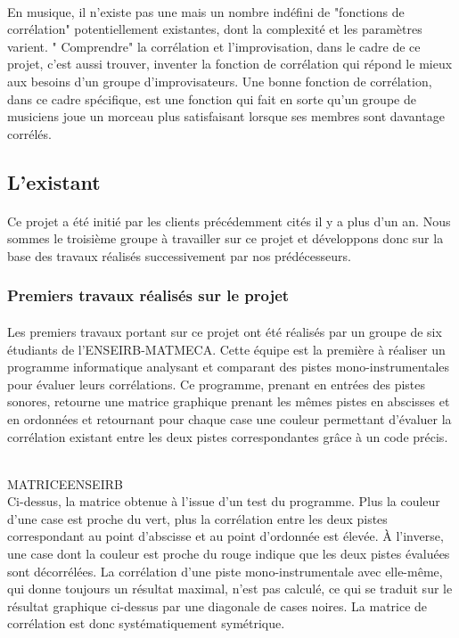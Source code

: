 \paragraph{}
En musique, il n'existe pas une mais un nombre indéfini de "fonctions
de corrélation" potentiellement existantes, dont la complexité et les
paramètres varient. " Comprendre" la corrélation et l'improvisation,
dans le cadre de ce projet, c'est aussi trouver, inventer la fonction
de corrélation qui répond le mieux aux besoins d'un groupe
d'improvisateurs. Une bonne fonction de corrélation, dans ce cadre
spécifique, est une fonction qui fait en sorte qu'un groupe de
musiciens joue un morceau plus satisfaisant lorsque ses membres sont
davantage corrélés.

\subsection{L'existant}
\paragraph{}
Ce projet a été initié par les clients précédemment cités il y a plus
d'un an. Nous sommes le troisième groupe à travailler sur ce projet et
développons donc sur la base des travaux réalisés successivement par
nos prédécesseurs.

\subsubsection{Premiers travaux réalisés sur le projet}
\paragraph{}
Les premiers travaux portant sur ce projet ont été réalisés par un
groupe de six étudiants de l'ENSEIRB-MATMECA. Cette équipe est la
première à réaliser un programme informatique analysant et comparant
des pistes mono-instrumentales pour évaluer leurs corrélations. Ce
programme, prenant en entrées des pistes sonores, retourne une matrice
graphique prenant les mêmes pistes en abscisses et en ordonnées et
retournant pour chaque case une couleur permettant d'évaluer la
corrélation existant entre les deux pistes correspondantes grâce à un
code précis.

\\
MATRICEENSEIRB
\\
Ci-dessus, la matrice obtenue à l'issue d'un test du programme. Plus
la couleur d'une case est proche du vert, plus la corrélation entre
les deux pistes correspondant au point d'abscisse et au point
d'ordonnée est élevée. À l'inverse, une case dont la couleur est
proche du rouge indique que les deux pistes évaluées sont
décorrélées. La corrélation d'une piste mono-instrumentale avec
elle-même, qui donne toujours un résultat maximal, n'est pas calculé,
ce qui se traduit sur le résultat graphique ci-dessus par une
diagonale de cases noires. La matrice de corrélation est donc
systématiquement symétrique.


